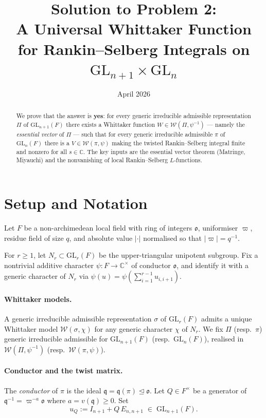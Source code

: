 \documentclass[12pt]{article}
\title{Solution to Problem 2:\\
A Universal Whittaker Function for Rankin--Selberg Integrals on
$\mathrm{GL}_{n+1}\times\mathrm{GL}_n$}
\author{}
\date{April 2026}
\theoremstyle{definition}
\theoremstyle{remark}
\begin{document}
\maketitle

\begin{abstract}
We prove that the answer is \textbf{yes}: for every generic irreducible admissible
representation $\Pi$ of $\mathrm{GL}_{n+1}(F)$ there exists a Whittaker function
$W\in\mathcal{W}(\Pi,\psi^{-1})$ --- namely the \emph{essential vector} of $\Pi$
--- such that for every generic irreducible admissible $\pi$ of $\mathrm{GL}_n(F)$
there is a $V\in\mathcal{W}(\pi,\psi)$ making the twisted Rankin--Selberg integral
finite and nonzero for all $s\in\mathbb{C}$.
The key inputs are the essential vector theorem (Matringe, Miyauchi) and the
nonvanishing of local Rankin--Selberg $L$-functions.
\end{abstract}

\section{Setup and Notation}

Let $F$ be a non-archimedean local field with ring of integers $\mathfrak{o}$,
uniformiser $\varpi$, residue field of size $q$, and absolute value $|\cdot|$
normalised so that $|\varpi|=q^{-1}$.

For $r\ge1$, let $N_r\subset\mathrm{GL}_r(F)$ be the upper-triangular unipotent
subgroup.  Fix a nontrivial additive character $\psi:F\to\mathbb{C}^\times$ of
conductor $\mathfrak{o}$, and identify it with a generic character of $N_r$ via
$\psi(u)=\psi\!\left(\sum_{i=1}^{r-1}u_{i,i+1}\right)$.

\paragraph{Whittaker models.}
A generic irreducible admissible representation $\sigma$ of $\mathrm{GL}_r(F)$
admits a unique Whittaker model $\mathcal{W}(\sigma,\chi)$ for any generic
character $\chi$ of $N_r$.  We fix $\Pi$ (resp.\ $\pi$) generic irreducible
admissible for $\mathrm{GL}_{n+1}(F)$ (resp.\ $\mathrm{GL}_n(F)$), realised in
$\mathcal{W}(\Pi,\psi^{-1})$ (resp.\ $\mathcal{W}(\pi,\psi)$).

\paragraph{Conductor and the twist matrix.}
The \emph{conductor} of $\pi$ is the ideal $\mathfrak{q}=\mathfrak{q}(\pi)
\trianglelefteq\mathfrak{o}$.  Let $Q\in F^\times$ be a generator of
$\mathfrak{q}^{-1}=\varpi^{-a}\mathfrak{o}$ where $a=v(\mathfrak{q})\ge0$.  Set
\[
  u_Q := I_{n+1} + Q\,E_{n,n+1}\;\in\;\mathrm{GL}_{n+1}(F).
\]
\end{document}

